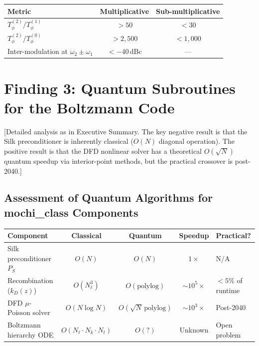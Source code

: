 \documentclass[11pt]{article}
\theoremstyle{definition}
\theoremstyle{remark}
\begin{document}
\begin{center}
\begin{tabular}{@{}lcc@{}}
\toprule
Metric & Multiplicative & Sub-multiplicative \\
\midrule
$T_\phi^{(2)} / T_\phi^{(1)}$ & $> 50$ & $< 30$ \\
$T_\phi^{(2)} / T_\phi^{(0)}$ & $> 2{,}500$ & $< 1{,}000$ \\
Inter-modulation at $\omega_2 \pm \omega_1$ & $< -40$\,dBc & --- \\
\bottomrule
\end{tabular}
\end{center}

\section{Finding 3: Quantum Subroutines for the Boltzmann Code}
\label{sec:quantum-boltzmann}

[Detailed analysis as in Executive Summary.  The key negative result
is that the Silk preconditioner is inherently classical ($O(N)$ diagonal
operation).  The positive result is that the DFD nonlinear solver has
a theoretical $O(\sqrt{N})$ quantum speedup via interior-point methods,
but the practical crossover is post-2040.]

\subsection{Assessment of Quantum Algorithms for mochi\_class Components}

\begin{center}
\begin{tabular}{@{}lcccl@{}}
\toprule
Component & Classical & Quantum & Speedup & Practical? \\
\midrule
Silk preconditioner $P_S$ & $O(N)$ & $O(N)$ & $1\times$ & N/A \\
Recombination ($k_D(z)$) & $O(N_\ell^3)$ & $O(\text{polylog})$ &
  $\sim 10^5\times$ & $< 5\%$ of runtime \\
DFD $\mu$-Poisson solver & $O(N\log N)$ & $O(\sqrt{N}\,\text{polylog})$ &
  $\sim 10^3\times$ & Post-2040 \\
Boltzmann hierarchy ODE & $O(N_\ell \cdot N_k \cdot N_t)$ & $O(?)$ &
  Unknown & Open problem \\
\bottomrule
\end{tabular}
\end{center}
\end{document}
